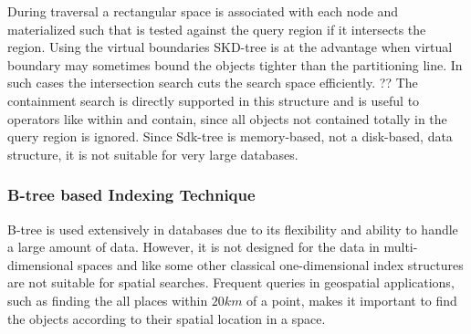 \documentclass[a4paper,12pt]{article}
\begin{document}
During traversal a rectangular space is associated with each node and materialized  such that is tested against the query region if it intersects the region. 
Using the virtual boundaries SKD-tree is at the advantage when virtual boundary may sometimes bound the objects tighter than the partitioning line. In such cases the intersection search cuts the search space efficiently. ?? The containment search is directly supported in this structure and is useful to operators like within and contain, since all objects not contained totally in the query region is ignored.
Since Sdk-tree is memory-based, not a disk-based, data structure, it is not suitable for very large databases.


 


\subsubsection{B-tree based Indexing Technique}
\label{b-tree-based}
B-tree is used extensively in databases due to its flexibility and ability to handle a large amount of data. However, it is not designed for the data in multi-dimensional spaces and like some other classical one-dimensional index structures are not suitable for spatial searches. Frequent queries in geospatial applications, such as finding the all places within $20 km$ of a point, makes it important to find the objects according to their spatial location in a space. 
\end{document}

